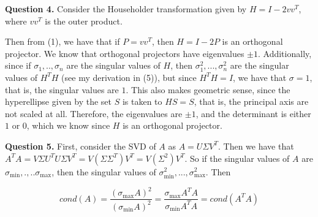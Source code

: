 \documentclass{article}
\begin{document}
\textbf{Question 4.} Consider the Householder transformation given by $H=I-2vv^T$, where $vv^T$ is the outer product. 

Then from (1), we have that if $P=vv^T$, then $H=I-2P$ is an orthogonal projector. We know that orthogonal projectors have eigenvalues $\pm 1$. Additionally, since if $\sigma_1,..,\sigma_n$ are the singular values of $H$, then $\sigma_1^2,...,\sigma_n^2$ are the singular values of $H^T H$ (see my derivation in (5)), but since $H^T H = I$, we have that $\sigma=1$, that is, the singular values are $1$. This also makes geometric sense, since the hyperellipse given by the set $S$ is taken to $HS = S$, that is, the principal axis are not scaled at all. Therefore, the eigenvalues are $\pm 1$, and the determinant is either $1$ or $0$, which we know since $H$ is an orthogonal projector.

\textbf{Question 5.} First, consider the SVD of $A$ as $A=U\Sigma V^{T}$. Then we have that $A^TA=V\Sigma U^T U \Sigma V^T = V(\Sigma\Sigma^T)V^T = V(\Sigma^2)V^T$. So if the singular values of $A$ are $\sigma_{\min},.,..\sigma_{\max}$, then the singular values of $\sigma_{\min}^2,...,\sigma_{\max}^2$. Then

\begin{equation*}
    cond(A) = \frac{(\sigma_{\max}A)^2}{(\sigma_{\min}A)^2} = \frac{\sigma_{\max}A^TA}{\sigma_{\min}A^TA} = cond(A^T A)
\end{equation*}
\end{document}

